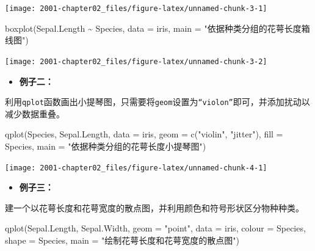 \documentclass[
]{book}
\newenvironment{Shaded}{\begin{snugshade}}{\end{snugshade}}
\newcommand{\AttributeTok}[1]{\textcolor[rgb]{0.77,0.63,0.00}{#1}}
\newcommand{\FunctionTok}[1]{\textcolor[rgb]{0.00,0.00,0.00}{#1}}
\newcommand{\NormalTok}[1]{#1}
\newcommand{\SpecialCharTok}[1]{\textcolor[rgb]{0.00,0.00,0.00}{#1}}
\newcommand{\StringTok}[1]{\textcolor[rgb]{0.31,0.60,0.02}{#1}}
\providecommand{\tightlist}{%
  \setlength{\itemsep}{0pt}\setlength{\parskip}{0pt}}
\begin{document}
\begin{center}\texttt{[image: 2001-chapter02\_files/figure-latex/unnamed-chunk-3-1]} \end{center}

\begin{Shaded}
\begin{Highlighting}[]
\FunctionTok{boxplot}\NormalTok{(Sepal.Length }\SpecialCharTok{\textasciitilde{}}\NormalTok{ Species, }\AttributeTok{data =}\NormalTok{ iris, }\AttributeTok{main =} \StringTok{"依据种类分组的花萼长度箱线图"}\NormalTok{)}
\end{Highlighting}
\end{Shaded}

\begin{center}\texttt{[image: 2001-chapter02\_files/figure-latex/unnamed-chunk-3-2]} \end{center}

\begin{itemize}
\tightlist
\item
  \textbf{例子二：}
\end{itemize}

利用\texttt{qplot}函数画出小提琴图，只需要将\texttt{geom}设置为\texttt{“violon”}即可，并添加扰动以减少数据重叠。

\begin{Shaded}
\begin{Highlighting}[]
\FunctionTok{qplot}\NormalTok{(Species, Sepal.Length, }\AttributeTok{data =}\NormalTok{ iris, }\AttributeTok{geom =} \FunctionTok{c}\NormalTok{(}\StringTok{"violin"}\NormalTok{, }\StringTok{"jitter"}\NormalTok{), }\AttributeTok{fill =}\NormalTok{ Species, }
    \AttributeTok{main =} \StringTok{"依据种类分组的花萼长度小提琴图"}\NormalTok{)}
\end{Highlighting}
\end{Shaded}

\begin{center}\texttt{[image: 2001-chapter02\_files/figure-latex/unnamed-chunk-4-1]} \end{center}

\begin{itemize}
\tightlist
\item
  \textbf{例子三：}
\end{itemize}

建一个以花萼长度和花萼宽度的散点图，并利用颜色和符号形状区分物种种类。

\begin{Shaded}
\begin{Highlighting}[]
\FunctionTok{qplot}\NormalTok{(Sepal.Length, Sepal.Width, }\AttributeTok{geom =} \StringTok{"point"}\NormalTok{, }\AttributeTok{data =}\NormalTok{ iris, }\AttributeTok{colour =}\NormalTok{ Species, }\AttributeTok{shape =}\NormalTok{ Species, }
    \AttributeTok{main =} \StringTok{"绘制花萼长度和花萼宽度的散点图"}\NormalTok{)}
\end{Highlighting}
\end{Shaded}
\end{document}

